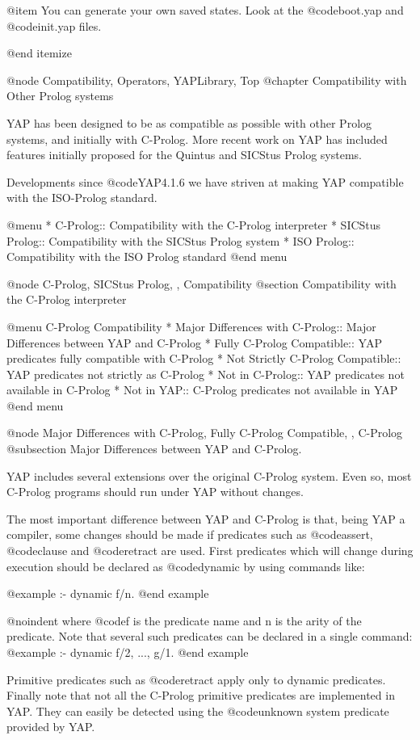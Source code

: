 {{{{{{{{{@item You can generate your own saved states. Look at  the
@code{boot.yap} and @code{init.yap} files.

@end itemize

@node Compatibility, Operators, YAPLibrary, Top
@chapter Compatibility with Other Prolog systems

YAP has been designed to be as compatible as possible with
other Prolog systems, and initially with C-Prolog. More recent work on
YAP has included features initially proposed for the Quintus
and SICStus Prolog systems.

Developments since @code{YAP4.1.6} we have striven at making
YAP compatible with the ISO-Prolog standard. 

@menu
* C-Prolog:: Compatibility with the C-Prolog interpreter
* SICStus Prolog:: Compatibility with the SICStus Prolog system
* ISO Prolog::  Compatibility with the ISO Prolog standard
@end menu

@node C-Prolog, SICStus Prolog, , Compatibility
@section Compatibility with the C-Prolog interpreter

@menu
C-Prolog Compatibility
* Major Differences with C-Prolog:: Major Differences between YAP and C-Prolog
* Fully C-Prolog Compatible:: YAP predicates fully compatible with
C-Prolog
* Not Strictly C-Prolog Compatible:: YAP predicates not strictly as C-Prolog
* Not in C-Prolog:: YAP predicates not available in C-Prolog
* Not in YAP:: C-Prolog predicates not available in YAP
@end menu

@node Major Differences with C-Prolog, Fully C-Prolog Compatible, , C-Prolog
@subsection Major Differences between YAP and C-Prolog.

YAP includes several extensions over the original C-Prolog system. Even
so, most C-Prolog programs should run under YAP without changes.

The most important difference between YAP and C-Prolog is that, being
YAP a compiler, some changes should be made if predicates such as
@code{assert}, @code{clause} and @code{retract} are used. First
predicates which will change during execution should be declared as
@code{dynamic} by using commands like:

@example
:- dynamic f/n.
@end example

@noindent where @code{f} is the predicate name and n is the arity of the
predicate. Note that  several such predicates can be declared in a
single command:
@example
 :- dynamic f/2, ..., g/1.
@end example

Primitive predicates such as @code{retract} apply only to dynamic
predicates.  Finally note that not all the C-Prolog primitive predicates
are implemented in YAP. They can easily be detected using the
@code{unknown} system predicate provided by YAP.

}}}}}}}}}
